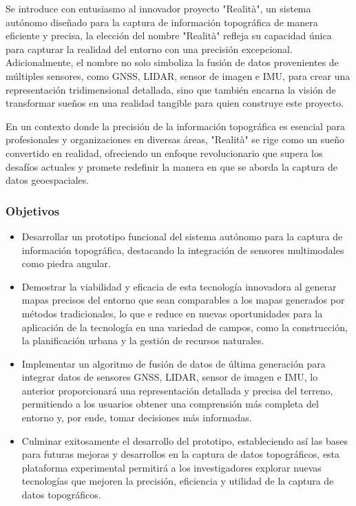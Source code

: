 \documentclass[12pt,a4paper, twoside]{article} %
\begin{document}
Se introduce con entusiasmo al innovador proyecto "Realità", un sistema autónomo diseñado para la captura de información topográfica de manera eficiente y precisa, la elección del nombre "Realità" refleja su capacidad única para capturar la realidad del entorno con una precisión excepcional. Adicionalmente, el nombre no solo simboliza la fusión de datos provenientes de múltiples sensores, como GNSS, LIDAR, sensor de imagen e IMU, para crear una representación tridimensional detallada, sino que también encarna la visión de transformar sueños en una realidad tangible para quien construye este proyecto.

En un contexto donde la precisión de la información topográfica es esencial para profesionales y organizaciones en diversas áreas, "Realità" se rige como un sueño convertido en realidad, ofreciendo un enfoque revolucionario que supera los desafíos actuales y promete redefinir la manera en que se aborda la captura de datos geoespaciales.


\subsubsection{Objetivos}
\label{subsec:org12e44a2}


\begin{itemize}

\item Desarrollar un prototipo funcional del sistema autónomo para la captura de información topográfica, destacando la integración de sensores multimodales como piedra angular.

\item Demostrar la viabilidad y eficacia de esta tecnología innovadora al generar mapas precisos del entorno que sean comparables a los mapas generados por métodos tradicionales, lo que e reduce en nuevas oportunidades para la aplicación de la tecnología en una variedad de campos, como la construcción, la planificación urbana y la gestión de recursos naturales.

\item Implementar un algoritmo de fusión de datos de última generación para integrar datos de sensores GNSS, LIDAR, sensor de imagen e IMU, lo anterior proporcionará una representación detallada y precisa del terreno, permitiendo a los usuarios obtener una comprensión más completa del entorno y, por ende, tomar decisiones más informadas.

\item Culminar exitosamente el desarrollo del prototipo, estableciendo así las bases para futuras mejoras y desarrollos en la captura de datos topográficos, esta plataforma experimental permitirá a los investigadores explorar nuevas tecnologías que mejoren la precisión, eficiencia y utilidad de la captura de datos topográficos.
\end{itemize}
\end{document}

